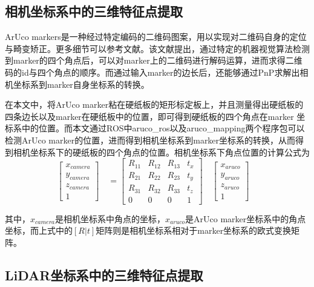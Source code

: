 \subsection{相机坐标系中的三维特征点提取}

ArUco markers是一种经过特定编码的二维码图案，用以实现对二维码自身的定位与畸变矫正。更多细节可以参考文献。该文献提出，通过特定的机器视觉算法检测到marker的四个角点后，可以对marker上的二维码进行解码运算，进而求得二维码的id与四个角点的顺序。而通过输入marker的边长后，还能够通过PnP求解出相机坐标系到marker自身坐标系的转换。


在本文中，将ArUco marker粘在硬纸板的矩形标定板上，并且测量得出硬纸板的四条边长以及marker在硬纸板中的位置，即可得到硬纸板的四个角点在marker 坐标系中的位置。而本文通过ROS中aruco\_ros以及aruco\_mapping两个程序包可以检测ArUco marker的位置，进而得到相机坐标系到marker坐标系的转换，从而得到相机坐标系下的硬纸板的四个角点的位置。相机坐标系下角点位置的计算公式为
\begin{equation}
\begin{bmatrix} x_{camera}\\y_{camera}\\z_{camera}\\ 1 \end{bmatrix}\quad = \begin{bmatrix} R_{11}&R_{12}&R_{13}&t_x\\R_{21}&R_{22}&R_{23}&t_y\\R_{31}&R_{32}&R_{33}&t_z\\ 0&0&0&1 \end{bmatrix}\quad \begin{bmatrix} x_{aruco}\\y_{aruco}\\z_{aruco}\\ 1 \end{bmatrix}\quad
\end{equation}
    
其中，$x_{camera}$是相机坐标系中角点的坐标，$x_{aruco}$是ArUco marker坐标系中的角点坐标，而上式中的$[R|t]$矩阵则是相机坐标系相对于marker坐标系的欧式变换矩阵。

\subsection{LiDAR坐标系中的三维特征点提取}


